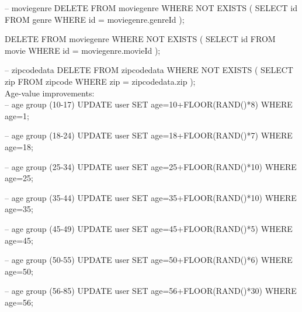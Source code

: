 -- moviegenre
DELETE FROM moviegenre
WHERE NOT EXISTS (
	SELECT id FROM genre
	WHERE id = moviegenre.genreId
);

DELETE FROM moviegenre
WHERE NOT EXISTS (
	SELECT id FROM movie
	WHERE id = moviegenre.movieId
);

-- zipcodedata
DELETE FROM zipcodedata
WHERE NOT EXISTS (
	SELECT zip FROM zipcode
	WHERE zip = zipcodedata.zip
);
\\
Age-value improvements: \\
-- age group (10-17)
UPDATE user
SET age=10+FLOOR(RAND()*8)
WHERE age=1;

-- age group (18-24)
UPDATE user
SET age=18+FLOOR(RAND()*7)
WHERE age=18;

-- age group (25-34)
UPDATE user
SET age=25+FLOOR(RAND()*10)
WHERE age=25;

-- age group (35-44)
UPDATE user
SET age=35+FLOOR(RAND()*10)
WHERE age=35;

-- age group (45-49)
UPDATE user
SET age=45+FLOOR(RAND()*5)
WHERE age=45;

-- age group (50-55)
UPDATE user
SET age=50+FLOOR(RAND()*6)
WHERE age=50;

-- age group (56-85)
UPDATE user
SET age=56+FLOOR(RAND()*30)
WHERE age=56;
